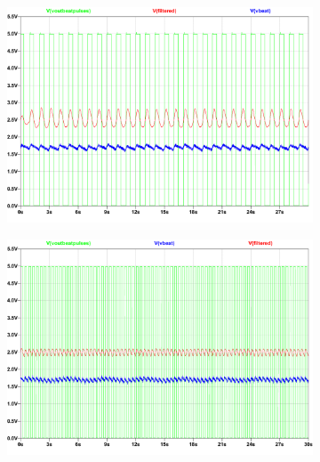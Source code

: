  \begin{figure}[ht]
 \footnotesize
 \centering

    \begin{subfigure}[]{0.48\textwidth}
              \centering
  		\includegraphics[width=1\linewidth]{./Figures/60BPM.pdf}
		    \caption{} \label{subfig:Pulse60}
     \end{subfigure}
     \begin{subfigure}[]{0.48\textwidth}
              \centering
  		\includegraphics[width=1\linewidth]{./Figures/150BPM.pdf}
		    \caption{} \label{subfig:Pulse150}

\end{subfigure}
\end{figure}

